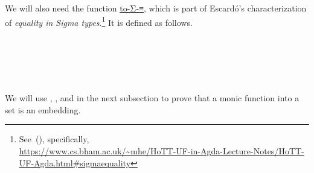 We will also need the function
\href{https://www.cs.bham.ac.uk/~mhe/HoTT-UF-in-Agda-Lecture-Notes/HoTT-UF-Agda.html\#sigmaequality}{to-Σ-≡},
which is part of Escardó's characterization of \emph{equality in Sigma types}.\footnote{See~(\cite{MHE}), specifically,\\\url{https://www.cs.bham.ac.uk/~mhe/HoTT-UF-in-Agda-Lecture-Notes/HoTT-UF-Agda.html\#sigmaequality}} It is defined as follows.
\ccpad
\begin{code}%
\>[1]\AgdaSpace{}%
\AgdaSymbol{:}\AgdaSpace{}%
\>[111I]\AgdaSymbol{\{}\AgdaSpace{}%
\AgdaSymbol{:}\AgdaSpace{}%
\AgdaSpace{}%
%
\AgdaSymbol{\}}\AgdaSpace{}%
\AgdaSymbol{\{}\AgdaSpace{}%
\AgdaSymbol{:}\AgdaSpace{}%
\AgdaSpace{}%
\AgdaSpace{}%
\AgdaSpace{}%
%
\AgdaSymbol{\}}\AgdaSpace{}%
\AgdaSymbol{\{}\AgdaSpace{}%
\AgdaSpace{}%
\AgdaSymbol{:}\AgdaSpace{}%
\AgdaSpace{}%
\AgdaSymbol{\}}\<%
\\
\>[1][@{}l@{\AgdaIndent{0}}]%
\>[2]%
\>[.][@{}l@{}]\<[111I]%
\>[10]\AgdaSpace{}%
\AgdaSpace{}%
\AgdaSpace{}%
\AgdaSpace{}%
\AgdaSpace{}%
\AgdaSpace{}%
\AgdaSpace{}%
\AgdaSpace{}%
\AgdaSpace{}%
\AgdaSpace{}%
\AgdaFunction{,}\AgdaSpace{}%
\AgdaSymbol{(}\AgdaSpace{}%
\AgdaSpace{}%
\AgdaSpace{}%
\AgdaSpace{}%
\AgdaSpace{}%
\AgdaSymbol{)}\AgdaSpace{}%
\AgdaSpace{}%
\AgdaSpace{}%
\AgdaSpace{}%
\<%
\\
\>[2]%
\>[10]\AgdaSpace{}%
\AgdaSpace{}%
\<%
\\
%
\\[\AgdaEmptyExtraSkip]%
%
\>[1]\AgdaSpace{}%
\AgdaSymbol{(}\AgdaSpace{}%
\AgdaSymbol{\{}\AgdaSpace{}%
\AgdaSymbol{=}\AgdaSpace{}%
\AgdaSymbol{\}}\AgdaSpace{}%
\AgdaOperator{\AgdaInductiveConstructor{,}}\AgdaSpace{}%
\AgdaSpace{}%
\AgdaSymbol{\{}\AgdaSpace{}%
\AgdaSymbol{=}\AgdaSpace{}%
\AgdaSymbol{\})}\AgdaSpace{}%
\AgdaSymbol{=}\AgdaSpace{}%
\AgdaSpace{}%
\AgdaSymbol{\{}\AgdaSpace{}%
\AgdaSymbol{=}\AgdaSpace{}%
\AgdaSymbol{(}\AgdaSpace{}%
\AgdaOperator{\AgdaInductiveConstructor{,}}\AgdaSpace{}%
\AgdaSymbol{)\}}\<%
\end{code}
\ccpad
We will use , , and  in the next subsection to prove that a monic function into a set is an embedding.

